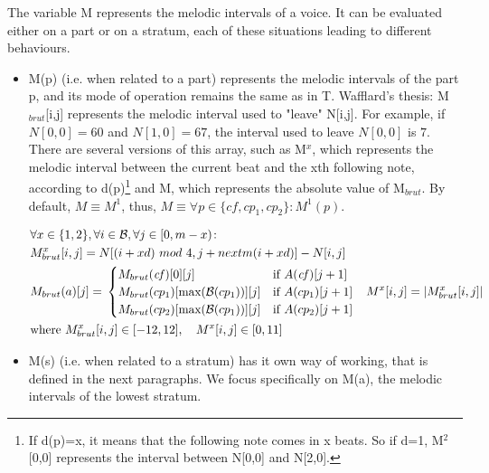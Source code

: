 The variable M represents the melodic intervals of a voice. It can be evaluated either on a part or on a stratum, each of these situations leading to different behaviours.
\begin{itemize}
    \item 

M(p) (i.e. when related to a part) represents the melodic intervals of the part p, and its mode of operation remains the same as in T. Wafflard's thesis: M$_{brut}$[i,j] represents the melodic interval used to "leave" N[i,j]. For example, if $N[0,0]=60$ and $N[1,0]=67$, the interval used to leave $N[0,0]$ is $7$. There are several versions of this array, such as M$^x$, which represents the melodic interval between the current beat and the xth following note, according to d(p)\footnote{If d(p)=x, it means that the following note comes in x beats. So if d=1, M$^2$[0,0] represents the interval between N[0,0] and N[2,0].} and M, which represents the absolute value of M$_{brut}$. By default, $M\equiv M^1$, thus, $M\equiv \forall p \in \{\mathit{cf}, cp_1, cp_2\} \colon M^1(p)$.

\begin{equation}
    \begin{aligned}
        &\forall x \in \{1, 2\}, \forall i \in \mathcal{B}, \forall j \in [0, m-x) \colon \\
        &M^x_{brut}[i, j] = N[(i+xd)\ mod\ 4, j+nextm(i+xd)] - N[i, j]\\
        &M_{brut}(a)[j] = \,  
        \begin{cases}
            M_{brut}(\mathit{cf})[0][j] & \text{if } A(\mathit{cf})[j+1]\\
            M_{brut}(cp_1)[\text{max}(\mathcal{B}(cp_1))][j] & \text{if } A(cp_1)[j+1]\\
            M_{brut}(cp_2)[\text{max}(\mathcal{B}(cp_1))][j] & \text{if } A(cp_2)[j+1]\\
        \end{cases}
        &M^x[i, j] = \left|M^x_{brut}[i, j]\right|\\
        &\text{where } M^x_{brut}[i, j] \in [-12, 12], \quad M^x[i, j] \in [0, 11] 
    \end{aligned}
\end{equation}


\item M(s) (i.e. when related to a stratum) has it own way of working, that is defined in the next paragraphs. We focus specifically on M(a), the melodic intervals of the lowest stratum.
\end{itemize}

